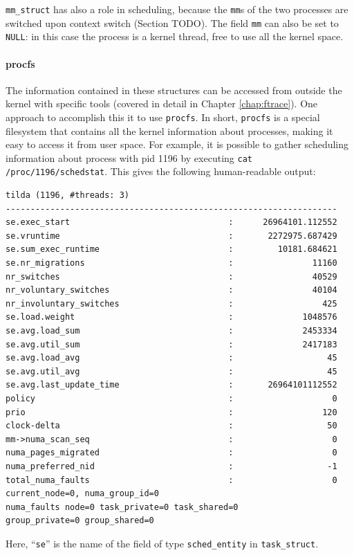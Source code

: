 \verb|mm_struct| has also a role in scheduling, because the \verb|mm|s of the two processes are switched upon context switch (Section TODO). The field \verb|mm| can also be set to \verb|NULL|: in this case the process is a kernel thread, free to use all the kernel space.

\paragraph{procfs}
The information contained in these structures can be accessed from outside the kernel with specific tools (covered in detail in Chapter \ref{chap:ftrace}). One approach to accomplish this it to use \verb|procfs|. In short, \verb|procfs| is a special filesystem that contains all the kernel information about processes, making it easy to access it from user space. For example, it is possible to gather scheduling information about process with pid 1196 by executing \verb|cat /proc/1196/schedstat|. This gives the following human-readable output:

\begin{verbatim}
tilda (1196, #threads: 3)
-------------------------------------------------------------------
se.exec_start                                :      26964101.112552
se.vruntime                                  :       2272975.687429
se.sum_exec_runtime                          :         10181.684621
se.nr_migrations                             :                11160
nr_switches                                  :                40529
nr_voluntary_switches                        :                40104
nr_involuntary_switches                      :                  425
se.load.weight                               :              1048576
se.avg.load_sum                              :              2453334
se.avg.util_sum                              :              2417183
se.avg.load_avg                              :                   45
se.avg.util_avg                              :                   45
se.avg.last_update_time                      :       26964101112552
policy                                       :                    0
prio                                         :                  120
clock-delta                                  :                   50
mm->numa_scan_seq                            :                    0
numa_pages_migrated                          :                    0
numa_preferred_nid                           :                   -1
total_numa_faults                            :                    0
current_node=0, numa_group_id=0
numa_faults node=0 task_private=0 task_shared=0 
group_private=0 group_shared=0
\end{verbatim}
Here, ``\verb|se|'' is the name of the field of type \verb|sched_entity| in \verb|task_struct|.

